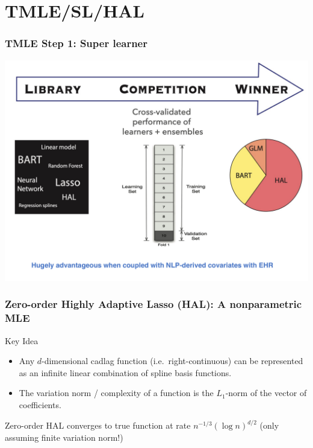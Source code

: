 \documentclass[t]{beamer}
\begin{document}
\section{TMLE/SL/HAL}
\begin{frame}
\frametitle{TMLE Step 1: Super learner}
\vspace{-15pt}
\begin{center}
\includegraphics[width = 1\textwidth]{figures/SL.pdf}
\end{center}
\end{frame}
\begin{frame}
\frametitle{Zero-order Highly Adaptive Lasso (HAL): A nonparametric MLE}

\begin{block}{\large{Key Idea}}
\begin{itemize}
\vspace{.1in}
\item Any $d$-dimensional cadlag function (i.e.~right-continuous) can be represented as an infinite linear combination of spline basis functions.
\vspace{.05in}
\item The variation norm / complexity of a function is the $L_1$-norm of the vector of coefficients.
\vspace{.1in}
\end{itemize}
\end{block}

\vspace{.25in}

\begin{center}
{\large Zero-order HAL converges to true function at rate $n^{-1/3}(\log n)^{d/2}$ (only assuming finite variation norm!)}
\end{center}

\end{frame}
\end{document}
